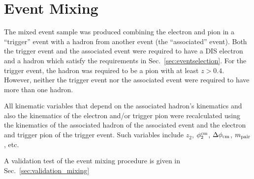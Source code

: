 \section{Event Mixing}
The mixed event sample was produced combining the electron and pion in a ``trigger'' event with a hadron from another event (the ``associated'' event).  Both the trigger event and the associated event were required to have a DIS electron and a hadron which satisfy the requirements in Sec.~\ref{sec:eventselection}.  For the trigger event, the hadron was required to be a pion with at least $z>0.4$. However, neither the trigger event nor the associated event were required to have more than one hadron.  



All kinematic variables that depend on the associated hadron's kinematics and also the kinematics of the electron and/or trigger pion were recalculated using the kinematics of the associated hadron of the associated event and the electron and trigger pion of the trigger event.  Such variables include $z_2$, $\phi^{\rm cm}_2$, $\Delta\phi_{\rm cm}$, $m_{\rm pair}$, etc.  

A validation test of the event mixing procedure is given in Sec.~\ref{sec:validation_mixing}




